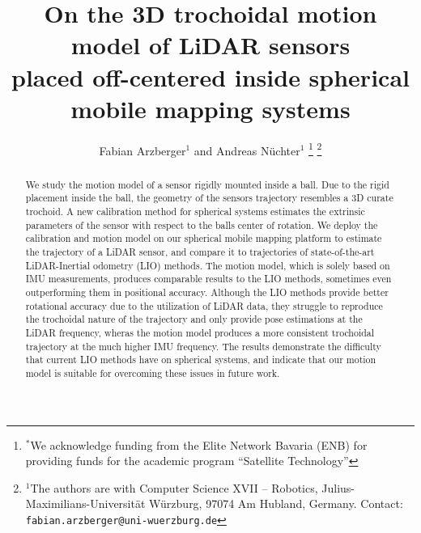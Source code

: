 \documentclass[a4paper, 10pt, conference]{ieeeconf}      %
\title{\LARGE \bf
On the 3D trochoidal motion model of LiDAR sensors\\placed off-centered inside spherical mobile mapping systems
}
\author{Fabian Arzberger$^{1}$ and Andreas N{\"u}chter$^{1}$%
\thanks{$^{*}$We acknowledge funding from the Elite Network Bavaria (ENB) for providing funds for the academic program ``Satellite Technology''}%
\thanks{$^{1}$The authors are with Computer Science XVII -- Robotics,
        Julius-Maximilians-Universit{\"a}t W{\"u}rzburg, 97074 Am Hubland, Germany.
        {Contact: \tt\small fabian.arzberger@uni-wuerzburg.de}}%
}
\begin{document}
\maketitle
\thispagestyle{empty}
\pagestyle{empty}


\begin{abstract}
We study the motion model of a sensor rigidly mounted inside a ball.
Due to the rigid placement inside the ball, the geometry of the sensors trajectory resembles a 3D curate trochoid.
A new calibration method for spherical systems estimates the extrinsic parameters of the sensor with respect to the balls center of rotation.
We deploy the calibration and motion model on our spherical mobile mapping platform to estimate the trajectory of a LiDAR sensor, and compare it to trajectories of state-of-the-art LiDAR-Inertial odometry (LIO) methods.
The motion model, which is solely based on IMU measurements, produces comparable results to the LIO methods, sometimes even outperforming them in positional accuracy.
Although the LIO methods provide better rotational accuracy due to the utilization of LiDAR data, they struggle to reproduce the trochoidal nature of the trajectory and only provide pose estimations at the LiDAR frequency, wheras the motion model produces a more consistent trochoidal trajectory at the much higher IMU frequency.
The results demonstrate the difficulty that current LIO methods have on spherical systems, and indicate that our motion model is suitable for overcoming these issues in future work. 
\end{abstract}






% 






\end{document}

